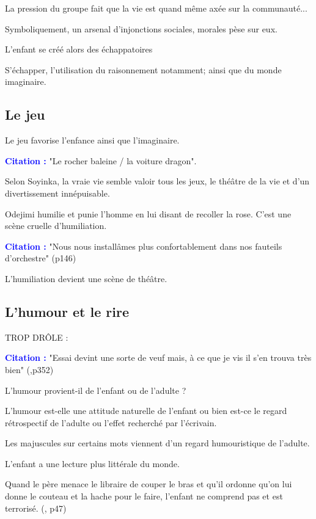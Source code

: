 \documentclass[a4paper, 11pt, hidelinks]{article}
\newcommand{\bs}{\bigskip}
\newcommand{\cit}{\large \textcolor{blue}{\textbf{Citation :}} \large }
\newcommand{\rb}[1]{\Romanbar{#1}}
\begin{document}
La pression du groupe fait que la vie est quand même axée sur la communauté...
\bs


Symboliquement, un arsenal d'injonctions sociales, morales pèse sur eux.
\bs


L'enfant se créé alors des échappatoires

S'échapper, l'utilisation du raisonnement notamment; ainsi que du monde imaginaire.



\subsection{Le jeu}


Le jeu favorise l'enfance ainsi que l'imaginaire. 

\cit "Le rocher baleine / la voiture dragon".

\bs

Selon Soyinka, la vraie vie semble valoir tous les jeux, le théâtre de la vie et d'un divertissement innépuisable.


Odejimi humilie et punie l'homme en lui disant de recoller la rose. C'est une scène cruelle d'humiliation.

\cit "Nous nous installâmes plus confortablement dans nos fauteils d'orchestre" (p146)

L'humiliation devient une scène de théâtre.




\subsection{L'humour et le rire}

TROP DRÔLE :

\cit "Essai devint une sorte de veuf mais, à ce que je vis il s'en trouva très bien" (\rb{13},p352)

\bs

L'humour provient-il de l'enfant ou de l'adulte ? 

L'humour est-elle une attitude naturelle de l'enfant ou bien est-ce le regard rétrospectif de l'adulte ou l'effet recherché par l'écrivain.

Les majuscules sur certains mots viennent d'un regard humouristique de l'adulte.

\bs

L'enfant a une lecture plus littérale du monde. 

Quand le père menace le libraire de couper le bras et qu'il ordonne qu'on lui donne le couteau et la hache pour le faire, l'enfant ne comprend pas et est terrorisé. (\rb{1}, p47)
\end{document}

